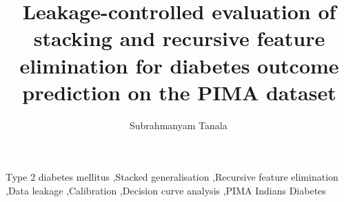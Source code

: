 \documentclass[preprint,12pt,authoryear=false]{elsarticle}
\begin{document}
\begin{frontmatter}

\title{Leakage-controlled evaluation of stacking and recursive feature elimination for diabetes outcome prediction on the PIMA dataset}

\author[anits]{Subrahmanyam Tanala\,\orcidlink{\authororcid}}



\begin{keyword}
Type 2 diabetes mellitus \sep Stacked generalisation \sep Recursive feature elimination \sep Data leakage \sep Calibration \sep Decision curve analysis \sep PIMA Indians Diabetes
\end{keyword}

\end{frontmatter}











\end{document}
